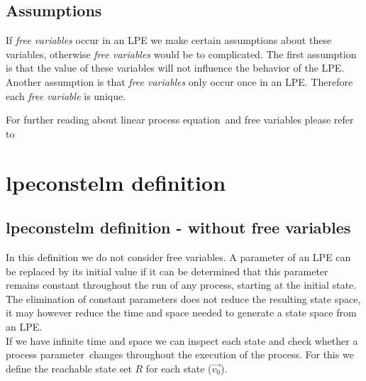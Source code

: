 \index{}\documentclass[a4paper,10pt]{article}
\theoremstyle{plain}
\theoremstyle{definition}
\newcommand{\lpe}{linear process equation}
\newcommand{\ovr}{\overrightarrow}
\newcommand{\pp}{process parameter}
\newcommand{\ti}{\textit}
\begin{document}
\subsection{Assumptions}
If \ti{free variables} occur in an LPE we make certain assumptions about these variables, otherwise \ti{free variables} would be to complicated. The first assumption is that the value of these variables will not influence the behavior of the LPE. Another assumption is that \ti{free variables} only occur once in an LPE. Therefore each \ti{free variable} is unique. %


 
For further reading about \lpe\ and free variables please refer to \cite{LPEfreevar} 

\section{lpeconstelm definition}
\subsection{lpeconstelm definition - without free variables}\label{subsec:lpedef}

In this definition we do not consider free variables.
A parameter of an LPE can be replaced by its initial value if it can be determined that this parameter remains constant throughout the run of any process, starting at the initial state. The elimination of constant parameters does not reduce the resulting state space, it may however reduce the time and space needed to generate a state space from an LPE. \\
If we have infinite time and space we can inspect each state and check whether a \pp\ changes throughout the execution of the process. For this we define the reachable state set $R$ for each state ($\ovr{v_0}$). 
\end{document}
